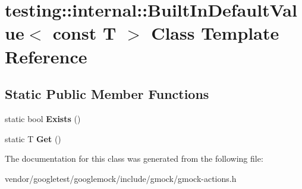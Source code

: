 \hypertarget{classtesting_1_1internal_1_1_built_in_default_value_3_01const_01_t_01_4}{}\section{testing\+:\+:internal\+:\+:Built\+In\+Default\+Value$<$ const T $>$ Class Template Reference}
\label{classtesting_1_1internal_1_1_built_in_default_value_3_01const_01_t_01_4}
\subsection*{Static Public Member Functions}
\begin{DoxyCompactItemize}
\item 
\mbox{\label{classtesting_1_1internal_1_1_built_in_default_value_3_01const_01_t_01_4_a1814803ec5dcc660ee1f1092a96b79fa}} 
static bool {\bfseries Exists} ()
\item 
\mbox{\label{classtesting_1_1internal_1_1_built_in_default_value_3_01const_01_t_01_4_a5996754952ecbcc5da77a2cebd4722de}} 
static T {\bfseries Get} ()
\end{DoxyCompactItemize}


The documentation for this class was generated from the following file\+:\begin{DoxyCompactItemize}
\item 
vendor/googletest/googlemock/include/gmock/gmock-\/actions.\+h\end{DoxyCompactItemize}
